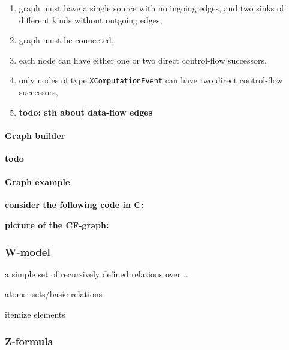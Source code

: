 \begin{enumerate}
\item graph must have a single source with no ingoing edges, and two sinks of different kinds without outgoing edges,
\item graph must be connected,
\item each node can have either one or two direct control-flow successors,
\item only nodes of type \texttt{XComputationEvent} can have two direct control-flow successors,
\item \textbf{todo: sth about data-flow edges}
\end{enumerate}


\paragraph{Graph builder} %
\label{ch:impl:model:xgraph:builder}

\textbf{todo}


\paragraph{Graph example}
\label{ch:impl:model:xgraph:example}
\textbf{consider the following code in C:}

\textbf{picture of the CF-graph:}


%

\subsubsection{W-model}
\label{ch:impl:model:wmodel}

a simple set of recursively defined relations over ..

atoms: sets/basic relations

itemize elements


\subsubsection{Z-formula}
\label{ch:impl:model:zformula}

